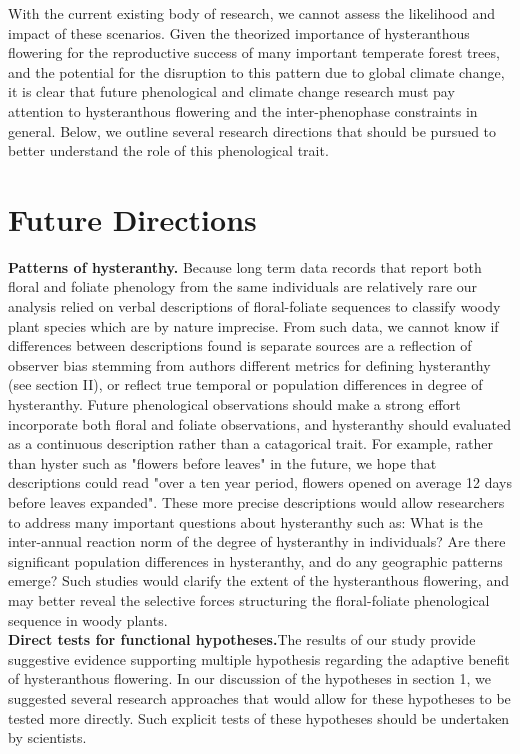 \documentclass{article}
\begin{document}
\indent With the current existing body of research, we cannot assess the likelihood and impact of these scenarios. Given the theorized importance of hysteranthous flowering for the reproductive success of many important temperate forest trees, and the potential for the disruption to this pattern due to global climate change, it is clear that future phenological and climate change research must pay attention to hysteranthous flowering and the inter-phenophase constraints in general. Below, we outline several research directions that should be pursued to better understand the role of this phenological trait.
\section*{Future Directions}

\indent \textbf{Patterns of hysteranthy.} Because long term data records that report both floral and foliate phenology from the same individuals are relatively rare \citep{Wolkovich2014} our analysis relied on verbal descriptions of floral-foliate sequences to classify woody plant species which are by nature imprecise. From such data, we cannot know if differences between descriptions found is separate sources are a reflection of observer bias stemming from authors different metrics for defining hysteranthy (see section II), or reflect true temporal or population differences in degree of hysteranthy. Future phenological observations should make a strong effort incorporate both floral and foliate observations, and hysteranthy should evaluated as a continuous description rather than a catagorical trait. For example, rather than hyster such as "flowers before leaves" in the future, we hope that descriptions could read "over a ten year period, flowers opened on average 12 days before leaves expanded". These more precise descriptions would allow researchers to address many important questions about hysteranthy such as: What is the inter-annual reaction norm of the degree of hysteranthy in individuals? Are there significant population differences in hysteranthy, and do any geographic patterns emerge? Such studies would clarify the extent of the hysteranthous flowering, and may better reveal the selective forces structuring the floral-foliate phenological sequence in woody plants.\\
\indent \textbf{Direct tests for functional hypotheses.}The results of our study provide suggestive evidence supporting multiple hypothesis regarding the adaptive benefit of hysteranthous flowering.  In our discussion of the hypotheses in section 1, we suggested several research approaches that would allow for these hypotheses to be tested more directly. Such explicit tests of these hypotheses should be undertaken by scientists.\\
\end{document}

